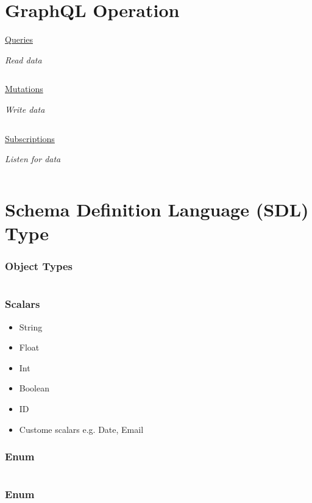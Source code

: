 \documentclass[12pt,xcolor=table]{beamer}
\begin{document}
\section{GraphQL Operation}

\begin{frame}
\underline{Queries}

\scriptsize\textit{Read data}
\inputminted{bash}{code/query.text}
\end{frame}

\begin{frame}

\underline{Mutations}

\scriptsize\textit{Write data}
\inputminted{bash}{code/mutation.text}

\end{frame}

\begin{frame}
\underline{Subscriptions}

\scriptsize\textit{Listen for data}
\inputminted{bash}{code/subscribe.text}
\end{frame}

\section{Schema Definition Language (SDL) Type}

\begin{frame}
\frametitle{Object Types}
\inputminted{bash}{code/object.text}
\end{frame}

\begin{frame}
\frametitle{Scalars}
\begin{itemize}
    \item String
    \item Float
    \item Int
    \item Boolean
    \item ID
    \item Custome scalars e.g. Date, Email
\end{itemize}
\end{frame}

\begin{frame}
\frametitle{Enum}
\inputminted{bash}{code/enum.text}
\end{frame}

\begin{frame}
\frametitle{Enum}
\inputminted{bash}{code/objectenum.text}
\end{frame}
\end{document}
